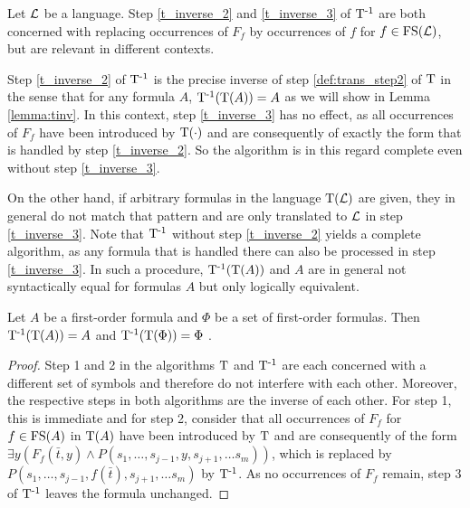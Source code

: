 \begin{remark}
	Let $\operatorname{\mathcal{L}}$ be a language.
	Step \ref{t_inverse_2} and \ref{t_inverse_3} of $\operatorname{T^{-1}}$ are both concerned with replacing occurrences of $F_f$ by occurrences of $f$ for $f \in \operatorname{FS}(\operatorname{\mathcal{L}})$, but are relevant in different contexts.

	Step \ref{t_inverse_2} of $\operatorname{T^{-1}}$ is the precise inverse of step \ref{def:trans_step2} of $\operatorname{T}$ in the sense that for any formula $A$, $\operatorname{T^{-1}}(\operatorname{T}(A)) = A$ as we will show in Lemma \ref{lemma:tinv}.
	In this context, step \ref{t_inverse_3} has no effect, as all occurrences of $F_f$ have been introduced by $\operatorname{T}(\cdot)$ and are consequently of exactly the form that is handled by step \ref{t_inverse_2}. 
	So the algorithm is in this regard complete even without step \ref{t_inverse_3}.

	On the other hand, if arbitrary formulas in the language $\operatorname{T}(\operatorname{\mathcal{L}})$ are given, 
	they in general do not match that pattern and are only translated to $\operatorname{\mathcal{L}}$ in step \ref{t_inverse_3}.
	Note that $\operatorname{T^{-1}}$ without step \ref{t_inverse_2} yields a complete algorithm, as any formula that is handled there can also be processed in step \ref{t_inverse_3}.
	In such a procedure, $\operatorname{T^{-1}}(\operatorname{T}(A))$ and $A$ are in general not syntactically equal for formulas $A$ but only logically equivalent. 
\end{remark}

\begin{lemma}
	\label{lemma:tinv}
	Let $A$ be a first-order formula and $\Phi$ be a set of first-order formulas.
	Then 
	$\operatorname{T^{-1}}(\operatorname{T}(A)) = A$
	and
	$\operatorname{T^{-1}}(\operatorname{T}(\Phi)) = \Phi$
	.
\end{lemma}
\begin{proof}
	Step 1 and 2 in the algorithms $\operatorname{T}$ and $\operatorname{T^{-1}}$ are each concerned with a different set of symbols and therefore do not interfere with each other.
	Moreover, the respective steps in both algorithms are the inverse of each other.
	For step 1, this is immediate and for step 2, consider that all occurrences of $F_f$ for $f \in \operatorname{FS}(A)$ in $\operatorname{T}(A)$ have been introduced by $\operatorname{T}$ and are consequently of the form
	$\exists y (F_f(\bar t, y) \land P(s_1, \ldots, s_{j-1}, y, s_{j+1}, \ldots s_m))$, which is replaced by 
	$P(s_1, \ldots, s_{j-1},\allowbreak f(\bar t),\allowbreak s_{j+1}, \ldots s_m)$ by $\operatorname{T^{-1}}$.
	As no occurrences of $F_f$ remain, step 3 of $\operatorname{T^{-1}}$ leaves the formula unchanged. 
\end{proof}

